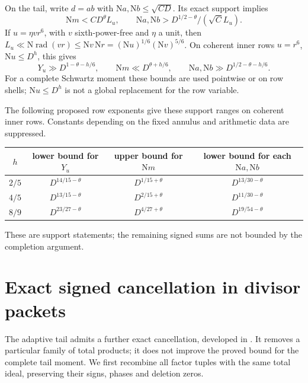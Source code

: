 \documentclass[11pt]{article}
\numberwithin{equation}{section}
\theoremstyle{definition}
\theoremstyle{remark}
\newcommand{\N}{\mathrm N}
\begin{document}
On the tail, write $d=ab$ with $\N a,\N b\le\sqrt{CD}$.  Its exact support
implies
\begin{equation}
 \N m<CD^\theta L_u,\qquad
 \N a,\N b>D^{1/2-\theta}/(\sqrt C L_u).
 \label{sfac:eq:tail-support}
\end{equation}
If $u=\eta vr^6$, with $v$ sixth-power-free and $\eta$ a unit, then
$L_u\ll \N\operatorname{rad}(vr)\le \N v\,\N r
=(\N u)^{1/6}(\N v)^{5/6}$.  On coherent inner rows $u=r^6$, $\N u\le D^h$,
this gives
\begin{equation}
 Y_u\gg D^{1-\theta-h/6},\qquad
 \N m\ll D^{\theta+h/6},\qquad
 \N a,\N b\gg D^{1/2-\theta-h/6}.
 \label{sfac:eq:coherent-support}
\end{equation}
For a complete Schwartz moment these bounds are used pointwise or on
row shells; $\N u\le D^h$ is not a global replacement for the row variable.

The following proposed row exponents give these support ranges on
coherent inner rows.  Constants depending on the fixed annulus and
arithmetic data are suppressed.
\begin{center}
\begin{tabular}{@{}cccc@{}}
\toprule
$h$ & lower bound for $Y_u$ & upper bound for $\N m$
    & lower bound for each $\N a,\N b$\\
\midrule
$2/5$ & $D^{14/15-\theta}$ & $D^{1/15+\theta}$
      & $D^{13/30-\theta}$\\
$4/5$ & $D^{13/15-\theta}$ & $D^{2/15+\theta}$
      & $D^{11/30-\theta}$\\
$8/9$ & $D^{23/27-\theta}$ & $D^{4/27+\theta}$
      & $D^{19/54-\theta}$\\
\bottomrule
\end{tabular}
\end{center}
These are support statements; the remaining signed sums are not bounded
by the completion argument.

\section{Exact signed cancellation in divisor packets}
\label{sec:packets}

The adaptive tail admits a further exact cancellation, developed in
\cite{N15}. It removes a particular family of total products; it does
not improve the proved bound for the complete tail moment. We first
recombine all factor tuples with the same total ideal, preserving
their signs, phases and deletion zeros.
\end{document}
